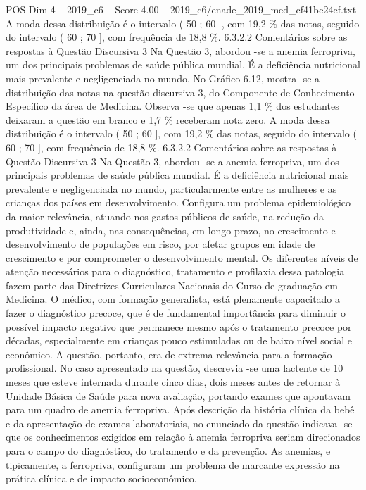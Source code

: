 \begin{textsample}{POS Dim 4 – 2019\_c6 – Score 4.00 – 2019\_c6/enade\_2019\_med\_cf41be24ef.txt}
A moda dessa distribuição é o intervalo ( 50 ; 60 ], com 19,2 \% das notas, seguido do intervalo ( 60 ; 70 ], com frequência de 18,8 \%. 6.3.2.2 Comentários sobre as respostas à Questão Discursiva 3 Na Questão 3, abordou -se a anemia ferropriva, um dos principais problemas de saúde pública mundial.
É a deficiência nutricional mais prevalente e negligenciada no mundo, No Gráfico 6.12, mostra -se a distribuição das notas na questão discursiva 3, do Componente de Conhecimento Específico da área de Medicina.
Observa -se que apenas 1,1 \% dos estudantes deixaram a questão em branco e 1,7 \% receberam nota zero.
A moda dessa distribuição é o intervalo ( 50 ; 60 ], com 19,2 \% das notas, seguido do intervalo ( 60 ; 70 ], com frequência de 18,8 \%. 6.3.2.2 Comentários sobre as respostas à Questão Discursiva 3 Na Questão 3, abordou -se a anemia ferropriva, um dos principais problemas de saúde pública mundial.
É a deficiência nutricional mais prevalente e negligenciada no mundo, particularmente entre as mulheres e as crianças dos países em desenvolvimento.
Configura um problema epidemiológico da maior relevância, atuando nos gastos públicos de saúde, na redução da produtividade e, ainda, nas consequências, em longo prazo, no crescimento e desenvolvimento de populações em risco, por afetar grupos em idade de crescimento e por comprometer o desenvolvimento mental.
Os diferentes níveis de atenção necessários para o diagnóstico, tratamento e profilaxia dessa patologia fazem parte das Diretrizes Curriculares Nacionais do Curso de graduação em Medicina.
O médico, com formação generalista, está plenamente capacitado a fazer o diagnóstico precoce, que é de fundamental importância para diminuir o possível impacto negativo que permanece mesmo após o tratamento precoce por décadas, especialmente em crianças pouco estimuladas ou de baixo nível social e econômico.
A questão, portanto, era de extrema relevância para a formação profissional.
No caso apresentado na questão, descrevia -se uma lactente de 10 meses que esteve internada durante cinco dias, dois meses antes de retornar à Unidade Básica de Saúde para nova avaliação, portando exames que apontavam para um quadro de anemia ferropriva.
Após descrição da história clínica da bebê e da apresentação de exames laboratoriais, no enunciado da questão indicava -se que os conhecimentos exigidos em relação à anemia ferropriva seriam direcionados para o campo do diagnóstico, do tratamento e da prevenção.
As anemias, e tipicamente, a ferropriva, configuram um problema de marcante expressão na prática clínica e de impacto socioeconômico.

\end{textsample}
